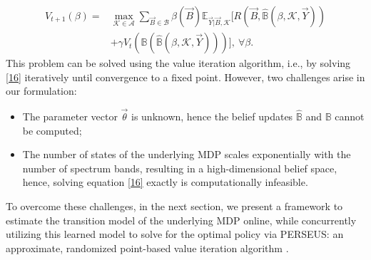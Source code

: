 \documentclass[10pt,twocolumn]{IEEEtran}
\begin{document}
\begin{align}\label{16}
\nonumber
    V_{t+1}(\beta) = &\max_{\mathcal{K} {\in} \mathcal{A}} \sum_{\vec{B} {\in} \mathcal{B}} \beta(\vec{B}) \mathbb{E}_{\vec{Y}|\vec{B}, \mathcal{K}} \Big[R(\vec{B}, \hat{\mathbb{B}}(\beta, \mathcal{K}, \vec{Y}))\\ &+\gamma V_{t}(\mathbb{B}(\hat{\mathbb{B}}(\beta, \mathcal{K}, \vec{Y})))\Big],\ \forall \beta.
\end{align}
This problem can be solved using the value iteration algorithm, i.e., by solving \eqref{16} iteratively until convergence to a fixed point. However, two challenges arise in our formulation:
\begin{itemize}
    \item The parameter vector $\vec{\theta}$ is unknown, hence the belief updates 
    $\hat{\mathbb B}$ and $\mathbb B$ cannot be computed;
    \item The number of states of the underlying MDP scales exponentially with the number of spectrum bands, resulting in a high-dimensional belief space, hence, solving equation \eqref{16} exactly is computationally infeasible.
\end{itemize}
To overcome these challenges, in the next section, we present a framework to estimate the transition model of the underlying MDP online, while concurrently utilizing this learned model to solve for the optimal policy via PERSEUS: an approximate, randomized point-based value iteration algorithm \cite{DBLP:journals/corr/abs-1109-2145}.
\vspace{-3mm}
\end{document}
